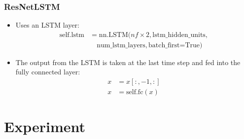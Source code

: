 \documentclass[conference]{IEEEtran}
\begin{document}
\begin{enumerate}
    \subsubsection{ResNetLSTM}
    \begin{itemize}
      \item Uses an LSTM layer: 
        \begin{align*}
          \text{self.lstm} &= \text{nn.LSTM}(nf \times 2, \text{lstm\_hidden\_units}, \\
                                          &\quad \text{num\_lstm\_layers}, \text{batch\_first=True})
        \end{align*}
      \item The output from the LSTM is taken at the last time step and fed into the fully connected layer: 
        \begin{align*}
          x &= x[:, -1, :] \\
          x &= \text{self.fc}(x)
        \end{align*}
    \end{itemize}

\end{enumerate}




\section{Experiment}
\end{document}

